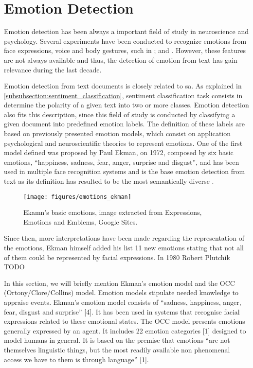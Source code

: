
\section{Emotion Detection}
\label{sec:emotion_detection}

Emotion detection has been always a important field of study in neuroscience and psychology. Several experiments have been conducted to recognize emotions from face expressions, voice and body gestures, such in \cite{bassili1979emotion}; \cite{banziger2009emotion} and \cite{gunes2007bi}. However, these features are not always available and thus, the detection of emotion from text has gain relevance during the last decade.

Emotion detection from text documents is closely related to \acrshort{sa}. As explained in \ref{subsubsection:sentiment_classification}, sentiment classification task consists in determine the polarity of a given text into two or more classes. Emotion detection also fits this description, since this field of study is conducted by classifying a given document into predefined emotion labels. The definition of these labels are based on previously presented emotion models, which consist on application psychological and neuroscientific theories to represent emotions. One of the first model defined was proposed by Paul Ekman, on 1972, composed by six basic emotions, ``happiness, sadness, fear, anger, surprise and disgust'', and has been used in multiple face recognition systems and is the base emotion detection from text \cite{StevenEmotion2011Classification} as its definition has resulted to be the most semantically diverse \cite{bann2013conceptualisation}.

\begin{figure}[!htp]
  \center
  \texttt{[image: figures/emotions\_ekman]}
  \caption{Ekamn's basic emotions, image extracted from Expressions, Emotions and Emblems, Google Sites.}
  \label{fig:ekman_basic_emotions}
\end{figure}

Since then, more interpretations have been made regarding the representation of the emotions, Ekman himself added his list 11 new emotions stating that not all of them could be represented by facial expressions. In 1980 Robert Plutchik TODO

\iffalse
In this section, we will briefly mention Ekman’s emotion model and the OCC (Ortony/Clore/Collins) model. Emotion models stipulate needed knowledge to appraise events. Ekman’s emotion model consists of “sadness, happiness, anger, fear, disgust and surprise” [4]. It has been used in systems that recognise facial expressions related to these emotional states. The OCC model presents emotions generally expressed by an agent. It includes 22 emotion categories [1] designed to model humans in general. It is based on the premise that emotions “are not themselves linguistic things, but the most readily available non phenomenal access we have to them is through language” [1].

